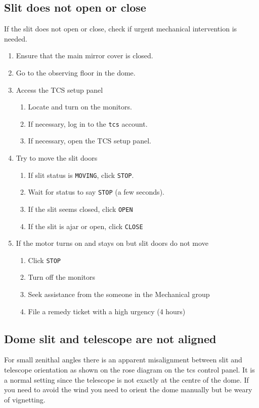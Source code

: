 \documentclass[11pt,fleqn,a4paper]{book}
\begin{document}
\subsection{Slit does not open or close}
If the slit does not open or close, check if urgent mechanical intervention is needed.

\begin{enumerate}
    \item Ensure that the main mirror cover is closed.
    \item Go to the observing floor in the \gls{dome}.
    \item Access the \gls{TCS setup panel}
        \begin{enumerate}
            \item Locate and turn on the monitors.
            \item If necessary, log in to the \texttt{tcs} account.
            \item If necessary, open the \gls{TCS setup panel}.
        \end{enumerate}
    \item Try to move the slit doors
        \begin{enumerate}
            \item If slit status is \texttt{MOVING}, click \texttt{STOP}.
            \item Wait for status to say \texttt{STOP} (a few seconds).
            \item If the slit seems closed, click \texttt{OPEN}
            \item If the slit is ajar or open, click \texttt{CLOSE}
        \end{enumerate}
    \item If the motor turns on and stays on but slit doors do not move
        \begin{enumerate}
            \item Click \texttt{STOP}
            \item Turn off the monitors
            \item Seek assistance from the someone in the Mechanical group
            \item File a remedy ticket with a high urgency (4 hours)
        \end{enumerate}
\end{enumerate}

\subsection{Dome slit and telescope are not aligned}
For small zenithal angles there is an apparent misalignment between \gls{slit} and telescope orientation as shown on the \gls{rose diagram} on the \gls{tcs} control panel. It is a normal setting since the telescope is not exactly at the centre of the \gls{dome}.  If you need to avoid the wind you need to orient the \gls{dome} manually but be weary of vignetting.
\end{document}

